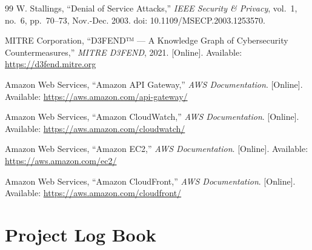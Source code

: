 \documentclass[12pt, a4paper]{report}   %
\providecommand{\backmatter}{}
\begin{document}
\begin{thebibliography}{99}
W. Stallings, ``Denial of Service Attacks,'' \textit{IEEE Security \& Privacy},
vol.~1, no.~6, pp.~70--73, Nov.-Dec. 2003. doi: 10.1109/MSECP.2003.1253570.

MITRE Corporation, ``D3FEND™ --- A Knowledge Graph of Cybersecurity
Countermeasures,'' \textit{MITRE D3FEND}, 2021. [Online]. Available:
\url{https://d3fend.mitre.org}

Amazon Web Services, ``Amazon API Gateway,'' \textit{AWS Documentation}.
[Online]. Available: \url{https://aws.amazon.com/api-gateway/}

Amazon Web Services, ``Amazon CloudWatch,'' \textit{AWS Documentation}.
[Online]. Available: \url{https://aws.amazon.com/cloudwatch/}

Amazon Web Services, ``Amazon EC2,'' \textit{AWS Documentation}.
[Online]. Available: \url{https://aws.amazon.com/ec2/}

Amazon Web Services, ``Amazon CloudFront,'' \textit{AWS Documentation}.
[Online]. Available: \url{https://aws.amazon.com/cloudfront/}

\end{thebibliography}

\backmatter

\appendix

\chapter{Project Log Book}
\label{app:logbook}
\end{document}
